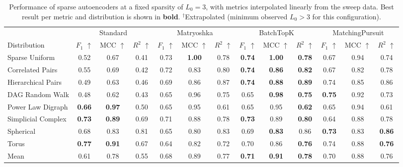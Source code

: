 \begin{table}[t]
  \centering

  \small
  \setlength{\tabcolsep}{4pt}

  \begin{tabular}{
      l
      ccc
      ccc
      ccc
      ccc
    }
    \toprule

    & \multicolumn{3}{c}{Standard}
    & \multicolumn{3}{c}{Matryoshka}
    & \multicolumn{3}{c}{BatchTopK}
    & \multicolumn{3}{c}{MatchingPursuit} \\

    \cmidrule(lr){2-4} \cmidrule(lr){5-7} \cmidrule(lr){8-10} \cmidrule(lr){11-13}

    Distribution
    & $F_1$ $\uparrow$ & MCC $\uparrow$ & $R^2$ $\uparrow$
    & $F_1$ $\uparrow$ & MCC $\uparrow$ & $R^2$ $\uparrow$
    & $F_1$ $\uparrow$ & MCC $\uparrow$ & $R^2$ $\uparrow$
    & $F_1$ $\uparrow$ & MCC $\uparrow$ & $R^2$ $\uparrow$\\

    \midrule

    Sparse Uniform       & 0.52 & 0.67 & 0.41 & 0.73 & \textbf{1.00} & 0.78 & \textbf{0.74} & \textbf{1.00} & \textbf{0.78} & 0.67 & 0.94 & 0.74 \\
    Correlated Pairs     & 0.55 & 0.69 & 0.42 & 0.72 & 0.83 & 0.80 & \textbf{0.74} & \textbf{0.86} & \textbf{0.82} & 0.67 & 0.82 & 0.78 \\
    Hierarchical Pairs   & 0.49 & 0.63 & 0.46 & 0.69 & 0.86 & 0.87 & \textbf{0.74} & \textbf{0.88} & \textbf{0.89} & 0.74 & 0.85 & 0.86 \\
    DAG Random Walk      & 0.48 & 0.62 & 0.43 & 0.65 & 0.96 & 0.75 & 0.65 & \textbf{0.98} & \textbf{0.75} & \textbf{0.75} & 0.92 & 0.73 \\
    Power Law Digraph    & \textbf{0.66} & \textbf{0.97} & 0.50 & 0.65 & 0.95 & 0.61 & 0.65 & 0.95 & \textbf{0.62} & 0.65 & 0.94 & 0.61 \\
    Simplicial Complex   & \textbf{0.73} & \textbf{0.89} & 0.69 & 0.71 & 0.88 & 0.78 & \textbf{0.73} & 0.89 & \textbf{0.80} & 0.64 & 0.88 & 0.78 \\
    Spherical            & 0.68 & 0.83 & 0.81 & 0.65 & 0.80 & 0.83 & 0.69 & \textbf{0.83} & 0.86 & \textbf{0.73} & 0.83 & \textbf{0.86} \\
    Torus                & \textbf{0.77} & \textbf{0.91} & 0.67 & 0.64 & 0.82 & 0.72 & 0.70 & 0.86 & \textbf{0.76} & 0.74 & 0.88 & \textbf{0.76} \\

    \midrule

    Mean                 & 0.61 & 0.78 & 0.55 & 0.68 & 0.89 & 0.77 & \textbf{0.71} & \textbf{0.91} & \textbf{0.78} & 0.70 & 0.88 & 0.76 \\

    \bottomrule
  \end{tabular}
  \caption{%
    Performance of sparse autoencoders at a fixed sparsity of $L_0 = 3$,
    with metrics interpolated linearly from the sweep data.
    Best result per metric and distribution is shown in \textbf{bold}.
    $^\dagger$Extrapolated (minimum observed $L_0 > 3$ for this configuration).
  }
  \label{tab:results-l0-3}

\end{table}
